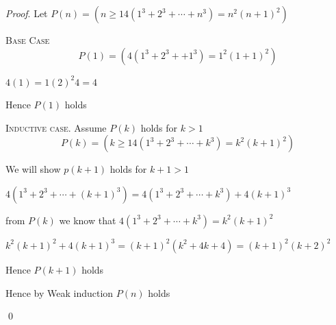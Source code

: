 
\textit{Proof}.
Let $P(n) = (n \geq 1 4(1^3 + 2^3 + \cdots + n^3) = n^2(n+1)^2)$

\textsc{Base Case}
\[
 P(1) = (4(1^3 + 2^3 +  + 1^3) = 1^2(1+1)^2)
\]

$4(1) = 1(2)^2 4 = 4$

Hence $P(1)$ holds

\textsc{Inductive case.}
Assume $P(k)$ holds for $k > 1$
\[
P(k) = (k \geq 1 4(1^3 + 2^3 + \cdots + k^3) = k^2(k+1)^2)
\]

We will show $p(k+1)$ holds for $k+1 > 1$

$4(1^3 + 2^3 + \cdots + (k+1)^3) = 4(1^3 + 2^3 + \cdots + k^3) + 4(k+1)^3$

from $P(k)$ we know that $4(1^3 + 2^3 + \cdots + k^3) = k^2(k+1)^2$

$k^2(k+1)^2 + 4(k+1)^3 = (k+1)^2(k^2 + 4k + 4) = (k+1)^2(k+2)^2$

Hence $P(k+1)$ holds

Hence by Weak induction $P(n)$ holds

\qed
